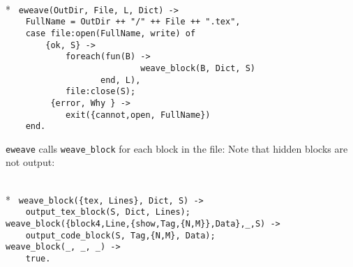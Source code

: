 \begin{flushleft}
\label{eweave_start}
\\*
\tt
\noindent{}%
\verb&eweave(OutDir, File, L, Dict) ->&\\
\noindent{}%
\verb&    FullName = OutDir ++ "/" ++ File ++ ".tex", &\\
\noindent{}%
\verb&    case file:open(FullName, write) of&\\
\noindent{}%
\verb&        {ok, S} ->&\\
\noindent{}%
\verb&            foreach(fun(B) -> &\\
\noindent{}%
\verb&                           weave_block(B, Dict, S) &\\
\noindent{}%
\verb&                   end, L),&\\
\noindent{}%
\verb&            file:close(S);&\\
\noindent{}%
\verb&         {error, Why } ->&\\
\noindent{}%
\verb&            exit({cannot,open, FullName})&\\
\noindent{}%
\verb&    end.&\\
\end{flushleft}

\verb+eweave+ calls \verb+weave_block+ for each block in the file:
Note that hidden blocks are not output:

\begin{flushleft}
\label{eweave_2_14}
\\*
\tt
\noindent{}%
\verb&weave_block({tex, Lines}, Dict, S) ->&\\
\noindent{}%
\verb&    output_tex_block(S, Dict, Lines);&\\
\noindent{}%
\verb&weave_block({block4,Line,{show,Tag,{N,M}},Data},_,S) ->&\\
\noindent{}%
\verb&    output_code_block(S, Tag,{N,M}, Data);&\\
\noindent{}%
\verb&weave_block(_, _, _) -> &\\
\noindent{}%
\verb&    true.&\\
\end{flushleft}

